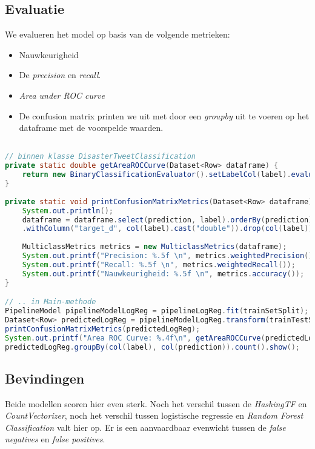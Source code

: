 \documentclass[a4paper,10pt,twoside]{report}
\begin{document}
\newpage

\subsection*{Evaluatie}

We evalueren het model op basis van de volgende metrieken:
\begin{itemize}
	\item Nauwkeurigheid
	\item De \textit{precision} en \textit{recall}.
	\item \textit{Area under ROC curve}
	\item De confusion matrix printen we uit met door een \textit{groupby} uit te voeren op het dataframe met de voorspelde waarden.
\end{itemize}

\begin{lstlisting}[language=Java]

// binnen klasse DisasterTweetClassification	
private static double getAreaROCCurve(Dataset<Row> dataframe) {
	return new BinaryClassificationEvaluator().setLabelCol(label).evaluate(dataframe);
}
	
private static void printConfusionMatrixMetrics(Dataset<Row> dataframe) {
	System.out.println();
	dataframe = dataframe.select(prediction, label).orderBy(prediction)
	.withColumn("target_d", col(label).cast("double")).drop(col(label));
	
	MulticlassMetrics metrics = new MulticlassMetrics(dataframe);
	System.out.printf("Precision: %.5f \n", metrics.weightedPrecision());
	System.out.printf("Recall: %.5f \n", metrics.weightedRecall());
	System.out.printf("Nauwkeurigheid: %.5f \n", metrics.accuracy());
}

// .. in Main-methode
PipelineModel pipelineModelLogReg = pipelineLogReg.fit(trainSetSplit);
Dataset<Row> predictedLogReg = pipelineModelLogReg.transform(trainTestSplit);
printConfusionMatrixMetrics(predictedLogReg);
System.out.printf("Area ROC Curve: %.4f\n", getAreaROCCurve(predictedLogReg));
predictedLogReg.groupBy(col(label), col(prediction)).count().show();
\end{lstlisting}

\subsection*{Bevindingen}

Beide modellen scoren hier even sterk. Noch het verschil tussen de \textit{HashingTF} en \textit{CountVectorizer}, noch het verschil tussen logistische regressie en \textit{Random Forest Classification} valt hier op. Er is een aanvaardbaar evenwicht tussen de \textit{false negatives} en \textit{false positives}.
\end{document}

